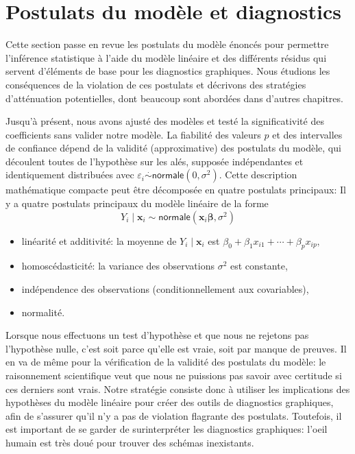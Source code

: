 \documentclass[
  11pt,
  letterpaper,
]{scrbook}
\providecommand{\tightlist}{%
  \setlength{\itemsep}{0pt}\setlength{\parskip}{0pt}}\usepackage{longtable,booktabs,array}
\theoremstyle{plain}
\theoremstyle{plain}
\theoremstyle{definition}
\theoremstyle{definition}
\theoremstyle{remark}
\begin{document}
\section{Postulats du modèle et
diagnostics}\label{postulats-du-moduxe8le-et-diagnostics}

Cette section passe en revue les postulats du modèle énoncés pour
permettre l'inférence statistique à l'aide du modèle linéaire et des
différents résidus qui servent d'éléments de base pour les diagnostics
graphiques. Nous étudions les conséquences de la violation de ces
postulats et décrivons des stratégies d'atténuation potentielles, dont
beaucoup sont abordées dans d'autres chapitres.

Jusqu'à présent, nous avons ajusté des modèles et testé la
significativité des coefficients sans valider notre modèle. La fiabilité
des valeurs \(p\) et des intervalles de confiance dépend de la validité
(approximative) des postulats du modèle, qui découlent toutes de
l'hypothèse sur les alés, supposée indépendantes et identiquement
distribuées avec
\(\varepsilon_i \stackrel{\cdot}{\sim} \mathsf{normale}(0, \sigma^2).\)
Cette description mathématique compacte peut être décomposée en quatre
postulats principaux: Il y a quatre postulats principaux du modèle
linéaire de la forme
\[Y_i \mid \mathbf{x}_i \sim \mathsf{normale}(\mathbf{x}_i\boldsymbol{\beta}, \sigma^2)\]

\begin{itemize}
\tightlist
\item
  linéarité et additivité: la moyenne de \(Y_i \mid \mathbf{x}_i\) est
  \(\beta_0 + \beta_1x_{i1} + \cdots + \beta_p x_{ip},\)
\item
  homoscédasticité: la variance des observations \(\sigma^2\) est
  constante,
\item
  indépendence des observations (conditionnellement aux covariables),
\item
  normalité.
\end{itemize}

Lorsque nous effectuons un test d'hypothèse et que nous ne rejetons pas
l'hypothèse nulle, c'est soit parce qu'elle est vraie, soit par manque
de preuves. Il en va de même pour la vérification de la validité des
postulats du modèle: le raisonnement scientifique veut que nous ne
puissions pas savoir avec certitude si ces derniers sont vrais. Notre
stratégie consiste donc à utiliser les implications des hypothèses du
modèle linéaire pour créer des outils de diagnostics graphiques, afin de
s'assurer qu'il n'y a pas de violation flagrante des postulats.
Toutefois, il est important de se garder de surinterpréter les
diagnostics graphiques: l'oeil humain est très doué pour trouver des
schémas inexistants.
\end{document}
